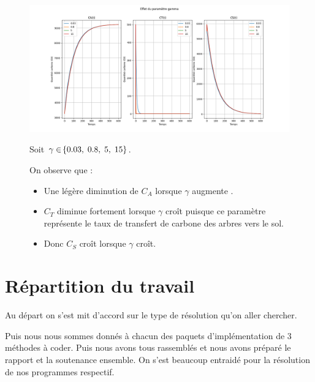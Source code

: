 \documentclass[12pt]{article}
\theoremstyle{saav}
\newcommand{\acc}[1]{\hspace{-0.05cm}\left\{#1 \right\}}
\begin{document}
	\begin{figure}[h]		
		\centering
			\begin{minipage}[h]{\linewidth}
				\centering
			\includegraphics[width=\linewidth]{images/gamma_var.png}
			\end{minipage}
			\par\vspace{0.5em}
			
			
			Soit $\gamma \in \acc{0.03,\hspace{1mm} 0.8,\hspace{1mm} 5,\hspace{1mm} 15} $.
			
			On observe que :
			\begin{itemize}[label*=\textbullet]
				\item Une légère diminution de $C_{A}$ lorsque $\gamma$ augmente . 
				\item $C_{T}$ diminue fortement lorsque $\gamma$ croît puisque ce paramètre représente le taux de transfert de carbone des arbres vers le sol. 
				\item Donc $C_{S}$ croît lorsque $\gamma$ croît.
			\end{itemize}
	\end{figure}
		

	

	
	
	\clearpage
	
	\section{Répartition du travail}
		Au départ on s'est mit d'accord sur le type de résolution qu'on aller chercher.
		
		Puis nous nous sommes donnés à chacun des paquets d'implémentation de 3 méthodes à coder. Puis nous avons tous rassemblés et nous avons préparé le rapport et la soutenance ensemble. On s'est beaucoup entraidé pour la résolution de nos programmes respectif.
	
\end{document}
